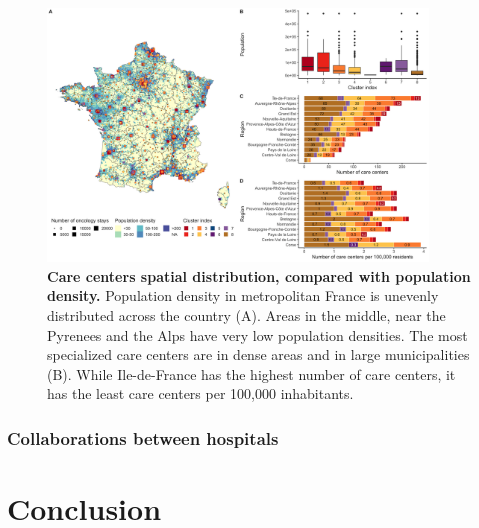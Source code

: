 \begin{figure}[H]
    \includegraphics[width=0.9\textwidth]{images/camion/supplemental/sup_fig4_care_centers_pop_density.png}
    \centering
    \caption{ \textbf{Care centers spatial distribution, compared with
            population density.} Population density in metropolitan France is
        unevenly distributed across the country (A). Areas in the middle, near
        the Pyrenees and the Alps have very low population densities. The most
        specialized care centers are in dense areas and in large municipalities
        (B). While Ile-de-France has the highest number of care centers, it has
        the least care centers per 100,000 inhabitants. }
    \label{fig:clustering-map}
\end{figure}

\subsubsection{Collaborations between hospitals}


\section{Conclusion}

